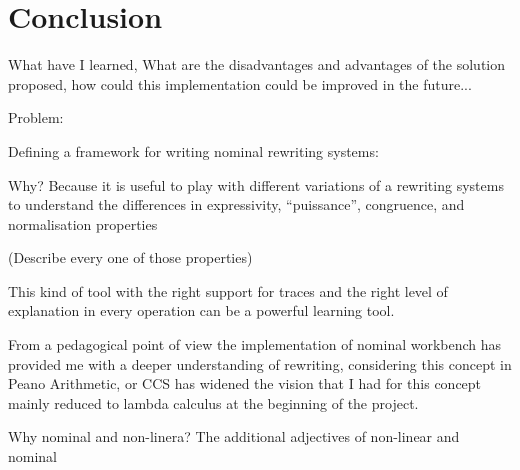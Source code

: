 \documentclass[12pt,a4paper]{article}
\begin{document}
\section{Conclusion}

What have I learned, What are the disadvantages and advantages of the
solution proposed, how could this implementation could be improved in
the future...

Problem:

Defining a framework for writing nominal rewriting systems:

Why? Because it is useful to play with different variations of a
rewriting systems to understand the differences in expressivity, ``puissance'',
congruence, and normalisation properties

(Describe every one of those properties)

This kind of tool with the right support for traces and the right level of explanation in every
operation can be a powerful learning tool.

From a pedagogical point of view the implementation of nominal
workbench has provided me with a deeper understanding of rewriting,
considering this concept in Peano Arithmetic, or CCS has widened the
vision that I had for this concept mainly reduced to lambda calculus
at the beginning of the project.


Why nominal and non-linera? The additional adjectives of non-linear and nominal 
\end{document}
